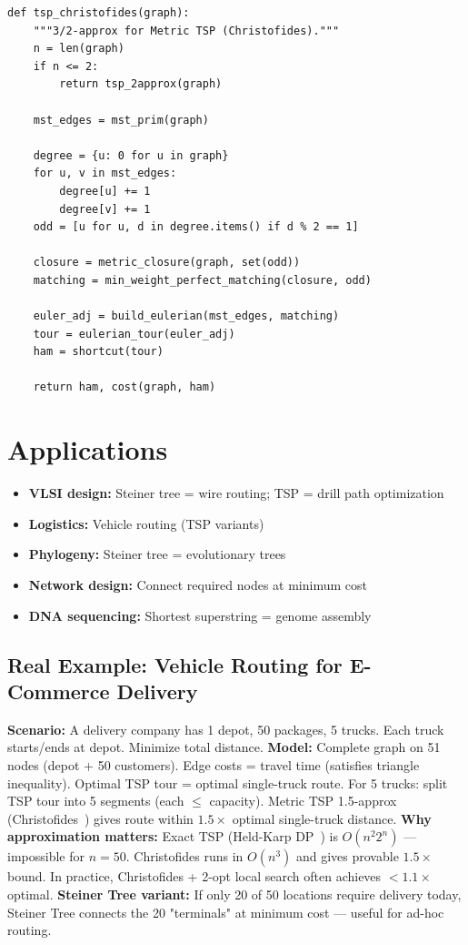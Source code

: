 \begin{lstlisting}[style=python, caption=Christofides TSP 3/2-Approximation]
def tsp_christofides(graph):
    """3/2-approx for Metric TSP (Christofides)."""
    n = len(graph)
    if n <= 2:
        return tsp_2approx(graph)

    mst_edges = mst_prim(graph)

    degree = {u: 0 for u in graph}
    for u, v in mst_edges:
        degree[u] += 1
        degree[v] += 1
    odd = [u for u, d in degree.items() if d % 2 == 1]

    closure = metric_closure(graph, set(odd))
    matching = min_weight_perfect_matching(closure, odd)

    euler_adj = build_eulerian(mst_edges, matching)
    tour = eulerian_tour(euler_adj)
    ham = shortcut(tour)

    return ham, cost(graph, ham)
\end{lstlisting}

\section{Applications}
\begin{itemize}
    \item \textbf{VLSI design:} Steiner tree = wire routing; TSP = drill path optimization
    \item \textbf{Logistics:} Vehicle routing (TSP variants)
    \item \textbf{Phylogeny:} Steiner tree = evolutionary trees
    \item \textbf{Network design:} Connect required nodes at minimum cost
    \item \textbf{DNA sequencing:} Shortest superstring = genome assembly
\end{itemize}

\subsection*{Real Example: Vehicle Routing for E-Commerce Delivery}
\textbf{Scenario:} A delivery company has 1 depot, 50 packages, 5 trucks. Each truck starts/ends at depot. Minimize total distance.
\textbf{Model:} Complete graph on 51 nodes (depot + 50 customers). Edge costs = travel time (satisfies triangle inequality). Optimal TSP tour = optimal single-truck route. For 5 trucks: split TSP tour into 5 segments (each $\leq$ capacity). Metric TSP 1.5-approx (Christofides~\cite{christofides76}) gives route within $1.5 \times$ optimal single-truck distance.
\textbf{Why approximation matters:} Exact TSP (Held-Karp DP~\cite{held-karp62}) is $O(n^2 2^n)$ --- impossible for $n=50$. Christofides runs in $O(n^3)$ and gives provable $1.5\times$ bound. In practice, Christofides + 2-opt local search often achieves $< 1.1\times$ optimal.
\textbf{Steiner Tree variant:} If only 20 of 50 locations require delivery today, Steiner Tree connects the 20 "terminals" at minimum cost — useful for ad-hoc routing.

